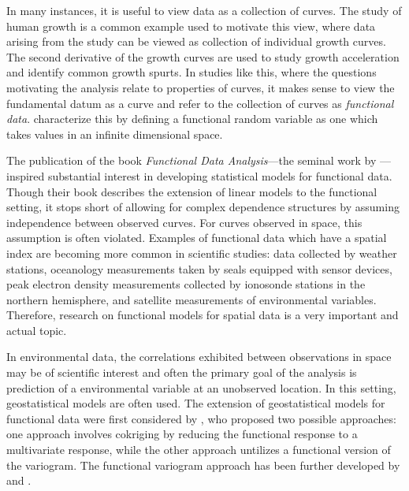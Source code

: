 
In many instances, it is useful to view data as a collection of curves. The study of human growth is a common example used to motivate this view, where data arising from the study can be viewed as collection of individual growth curves.  The second derivative of the growth curves are used to study growth acceleration and identify common growth spurts. In studies like this, where the questions motivating the analysis relate to properties of curves, it makes sense to view the fundamental datum as a curve and refer to the collection of curves as \emph{functional data}.  \cite{ferraty2006nonparametric} characterize this by defining a functional random variable as one which takes values in an infinite dimensional space. 

The publication of the book \emph{Functional Data Analysis}---the seminal work by \cite{FDA}---inspired substantial interest in developing statistical models for functional data.  Though their book describes the extension of linear models to the functional setting, it stops short of allowing for complex dependence structures by assuming independence between observed curves. For curves observed in space, this assumption is often violated. Examples of functional data which have a spatial index are becoming more common in scientific studies: data collected by weather stations, oceanology measurements taken by seals equipped with sensor devices, peak electron density measurements collected by ionosonde stations in the northern hemisphere, and satellite measurements of environmental variables. Therefore,  research on functional models for spatial data is a very important and actual topic.

 In environmental data,  the correlations exhibited between observations in space may be of scientific interest and often the primary goal of the analysis is prediction of a environmental variable at an unobserved location.  In this setting, geostatistical models are often used. The extension of geostatistical models for functional data were first considered by \cite{Goulard:1993}, who proposed two possible approaches: one approach involves cokriging by reducing the functional response to a multivariate response, while the other approach untilizes a functional version of the variogram.  The functional variogram approach has been further developed by \cite{Giraldo:2010jx} and \cite{Nerini:2010ba}.


